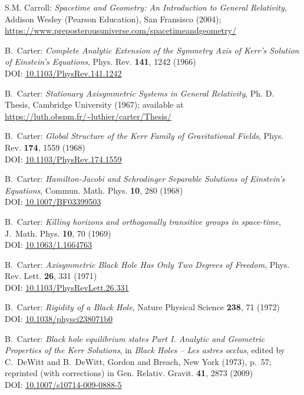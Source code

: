 \begin{thebibliography}{123}
S.M. Carroll: \emph{Spacetime and Geometry: An Introduction to General Relativity},
Addison Wesley (Pearson Education), San Fransisco (2004); \\
\url{https://www.preposterousuniverse.com/spacetimeandgeometry/}

B.~Carter:
{\em Complete Analytic Extension of the Symmetry Axis of Kerr's Solution of Einstein's Equations},
Phys. Rev. {\bf 141}, 1242 (1966)\\
DOI: \href{https://doi.org/10.1103/PhysRev.141.1242}{10.1103/PhysRev.141.1242}

B.~Carter: {\em Stationary Axisymmetric Systems in General Relativity},
Ph. D. Thesis, Cambridge University (1967); available at\\
\url{https://luth.obspm.fr/~luthier/carter/Thesis/}

B.~Carter:
{\em Global Structure of the Kerr Family of Gravitational Fields},
Phys. Rev. {\bf 174}, 1559 (1968)\\
DOI: \href{https://doi.org/10.1103/PhysRev.174.1559}{10.1103/PhysRev.174.1559}

B.~Carter:
{\em Hamilton-Jacobi and Schrodinger Separable Solutions of Einstein's Equations},
Commun. Math. Phys. {\bf 10}, 280 (1968)\\
DOI: \href{https://doi.org/10.1007/BF03399503}{10.1007/BF03399503}

B.~Carter:
{\em Killing horizons and orthogonally transitive groups in space-time},
J.~Math. Phys. {\bf 10}, 70 (1969)\\
DOI: \href{https://doi.org/10.1063/1.1664763}{10.1063/1.1664763}

B.~Carter:
{\em Axisymmetric Black Hole Has Only Two Degrees of Freedom},
Phys. Rev. Lett. {\bf 26}, 331 (1971)\\
DOI: \href{https://doi.org/10.1103/PhysRevLett.26.331}{10.1103/PhysRevLett.26.331}

B.~Carter:
{\em Rigidity of a Black Hole},
Nature Physical Science {\bf 238}, 71 (1972)\\
DOI: \href{https://doi.org/10.1038/physci238071b0}{10.1038/physci238071b0}

B.~Carter:
{\em Black hole equilibrium states Part I.
Analytic and Geometric Properties of the Kerr Solutions},
in {\em Black Holes -- Les astres occlus},  edited by C.~DeWitt and B.~DeWitt,
Gordon and Breach, New York (1973), p.~57; reprinted (with corrections) in
Gen. Relativ. Gravit. {\bf 41}, 2873 (2009)\\
DOI: \href{https://doi.org/10.1007/s10714-009-0888-5}{10.1007/s10714-009-0888-5}


\end{thebibliography}
